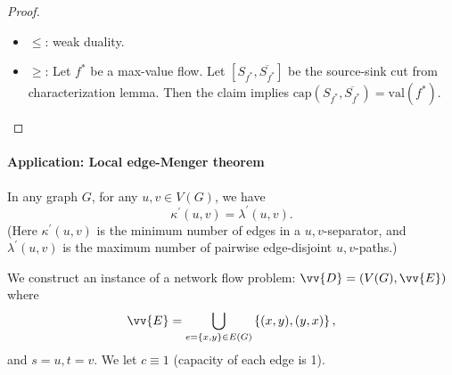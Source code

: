\begin{proof}
    \hfill 
    \begin{itemize}
        \item \(\le\): weak duality. 
        \item \(\ge\): Let \(f^*\) be a max-value flow. Let \([S_{f^*}, \overline{S_{f^*}} ]\) be the source-sink cut from characterization lemma. Then the claim implies \(\mathrm{cap}(S_{f^*}, \overline{S_{f^*}} ) = \mathrm{val}(f^*)\).      
    \end{itemize}
\end{proof}

\paragraph{Application: Local edge-Menger theorem} In any graph \(G\), for any \(u, v \in V(G)\), we have 
\[
    \kappa ^{\prime} (u, v) = \lambda ^{\prime} (u, v).
\]  
(Here \(\kappa^{\prime}  (u, v)\) is the minimum number of edges in a \(u, v\)-separator, and \(\lambda ^{\prime} (u, v)\) is the maximum number of pairwise edge-disjoint \(u, v\)-paths.) 

We construct an instance of a network flow problem: \(\vv{D} = (V(G), \vv{E})\) where 
\[
    \vv{E} = \bigcup_{e = \left\{ x, y \right\} \in E(G) } \left\{ (x, y), (y, x) \right\},  
\] 
and \(s = u, t = v\). We let \(c \equiv 1\) (capacity of each edge is 1). 

